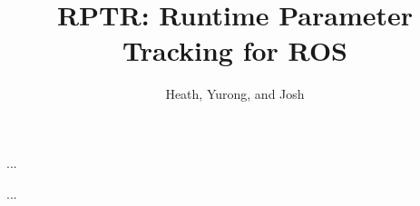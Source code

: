\documentclass[acmtocl,acmnow]{acmtrans2m}
\title{RPTR: Runtime Parameter Tracking for ROS}
\author{Heath, Yurong, and Josh}
\begin{document}
            
\begin{bottomstuff} 

\end{bottomstuff}
            
\maketitle







\begin{thebibliography}{...}
...
\end{thebibliography}

\begin{received}
...
\end{received}
\end{document}
